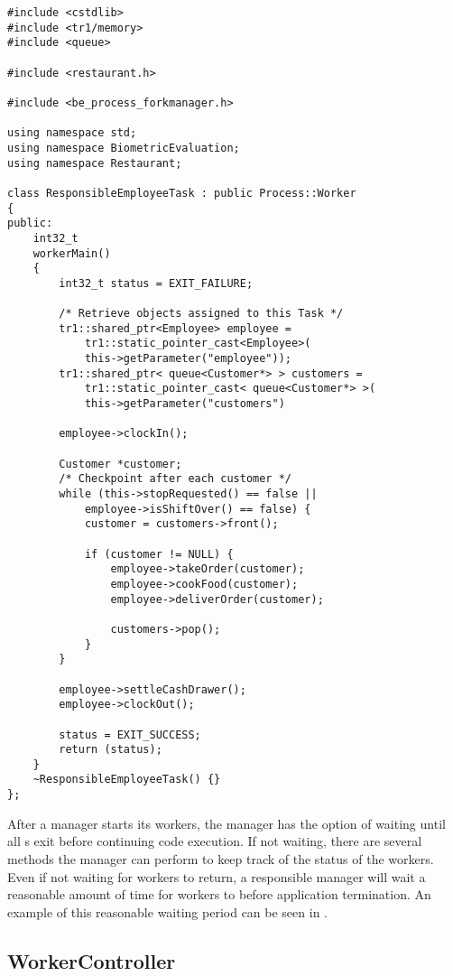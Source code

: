 \begin{lstlisting}[caption={A Responsible \class{Worker} Implementation}, label=lst:process_worker-example]
#include <cstdlib>
#include <tr1/memory>
#include <queue>

#include <restaurant.h>

#include <be_process_forkmanager.h>

using namespace std;
using namespace BiometricEvaluation;
using namespace Restaurant;

class ResponsibleEmployeeTask : public Process::Worker
{
public:
	int32_t
	workerMain()
	{
		int32_t status = EXIT_FAILURE;
		
		/* Retrieve objects assigned to this Task */
		tr1::shared_ptr<Employee> employee =
		    tr1::static_pointer_cast<Employee>(
		    this->getParameter("employee"));
		tr1::shared_ptr< queue<Customer*> > customers = 
		    tr1::static_pointer_cast< queue<Customer*> >(
		    this->getParameter("customers")
		
		employee->clockIn();
		
		Customer *customer;
		/* Checkpoint after each customer */
		while (this->stopRequested() == false ||
		    employee->isShiftOver() == false) {
			customer = customers->front();
			
			if (customer != NULL) {
				employee->takeOrder(customer);
				employee->cookFood(customer);
				employee->deliverOrder(customer);
				
				customers->pop();
			}
		}
		
		employee->settleCashDrawer();
		employee->clockOut();
		
		status = EXIT_SUCCESS;
		return (status);
	}
	~ResponsibleEmployeeTask() {}
};
\end{lstlisting}

After a manager starts its workers, the manager has the
option of waiting until all s exit 
before continuing code execution.  If not waiting,
there are several methods the manager can perform to keep track of the status
of the workers.  Even if not waiting for workers to return,
a responsible manager will wait a reasonable amount of time for
workers to  before application termination.  An example of this
reasonable waiting period can be seen in .

\subsection{WorkerController}
\label{subsec-process_workercontroller}

